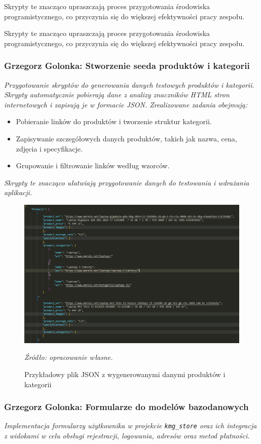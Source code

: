 \documentclass[12pt,a4paper,oneside]{article}
\theoremstyle{definition}
\numberwithin{equation}{section}
\begin{document}
Skrypty te znacząco upraszczają proces przygotowania środowiska programistycznego, co przyczynia się do większej efektywności pracy zespołu.


Skrypty te znacząco upraszczają proces przygotowania środowiska programistycznego, co przyczynia się do większej efektywności pracy zespołu.
%
%
\subsubsection{Grzegorz Golonka: Stworzenie seeda produktów i kategorii}
\label{section:1.3.22}
\textit{
Przygotowanie skryptów do generowania danych testowych produktów i kategorii. Skrypty automatycznie pobierają dane z analizy znaczników HTML stron internetowych i zapisują je w formacie JSON. Zrealizowane zadania obejmują:
}
\begin{itemize}
    \item Pobieranie linków do produktów i tworzenie struktur kategorii.
    \item Zapisywanie szczegółowych danych produktów, takich jak nazwa, cena, zdjęcia i specyfikacje.
    \item Grupowanie i filtrowanie linków według wzorców.
\end{itemize}

\textit{
Skrypty te znacząco ułatwiają przygotowanie danych do testowania i wdrażania aplikacji.
}

\begin{figure}[H]
    \centering
    \includegraphics[width=0.9\columnwidth]{images/krzysztofBImages/products_seed.png}
    \caption{Przykładowy plik JSON z wygenerowanymi danymi produktów i kategorii}
    \emph{Źródło: opracowanie własne.}
\end{figure}
%
%
\subsubsection{Grzegorz Golonka: Formularze do modelów bazodanowych}
\label{section:1.3.23}
\textit{
Implementacja formularzy użytkownika w projekcie \texttt{kmg\_store} oraz ich integracja z widokami w celu obsługi rejestracji, logowania, adresów oraz metod płatności.
}
\end{document}

